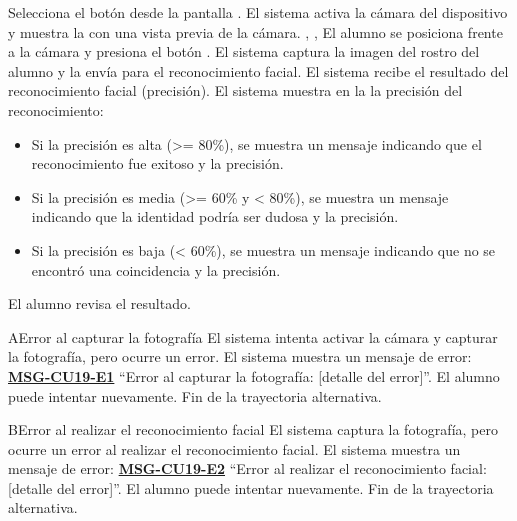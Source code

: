 \begin{UCtrayectoria}
	\UCpaso[\UCactor] Selecciona el botón  desde la pantalla .
	\UCpaso El sistema activa la cámara del dispositivo y muestra la  con una vista previa de la cámara. , , 
	\UCpaso[\UCactor] El alumno se posiciona frente a la cámara y presiona el botón .
	\UCpaso El sistema captura la imagen del rostro del alumno y la envía para el reconocimiento facial.
	\UCpaso El sistema recibe el resultado del reconocimiento facial (precisión).
	\UCpaso El sistema muestra en la  la precisión del reconocimiento:
	\begin{itemize}
		\item Si la precisión es alta (>= 80\%), se muestra un mensaje indicando que el reconocimiento fue exitoso y la precisión. 
		\item Si la precisión es media (>= 60\% y < 80\%), se muestra un mensaje indicando que la identidad podría ser dudosa y la precisión.
		\item Si la precisión es baja (< 60\%), se muestra un mensaje indicando que no se encontró una coincidencia y la precisión.
	\end{itemize}
	\UCpaso[\UCactor] El alumno revisa el resultado.
\end{UCtrayectoria}
\begin{UCtrayectoriaA}{A}{Error al capturar la fotografía}
	\UCpaso El sistema intenta activar la cámara y capturar la fotografía, pero ocurre un error.
	\UCpaso El sistema muestra un mensaje de error: \textbf{\hyperref[msg:CU19-E1]{MSG-CU19-E1}} ``Error al capturar la fotografía: [detalle del error]''.
	\UCpaso[\UCactor] El alumno puede intentar nuevamente.
	\UCpaso Fin de la trayectoria alternativa.
\end{UCtrayectoriaA}
\begin{UCtrayectoriaA}{B}{Error al realizar el reconocimiento facial}
	\UCpaso El sistema captura la fotografía, pero ocurre un error al realizar el reconocimiento facial.
	\UCpaso El sistema muestra un mensaje de error: \textbf{\hyperref[msg:CU19-E2]{MSG-CU19-E2}} ``Error al realizar el reconocimiento facial: [detalle del error]''.
	\UCpaso[\UCactor] El alumno puede intentar nuevamente.
	\UCpaso Fin de la trayectoria alternativa.
\end{UCtrayectoriaA}
